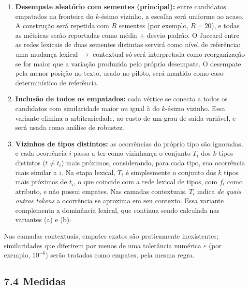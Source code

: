 \documentclass[11pt,a4paper]{article}
\begin{document}
\begin{enumerate}[label=(\alph*)]

    \item \textbf{Desempate aleatório com sementes (principal):} entre
    candidatos empatados na fronteira do $k$-ésimo vizinho, a escolha será
    uniforme ao acaso. A construção será repetida com $R$ sementes (por
    exemplo, $R=20$), e todas as métricas serão reportadas como média $\pm$
    desvio padrão. O Jaccard entre as redes lexicais de duas sementes
    distintas servirá como nível de referência: uma mudança lexical $\to$
    contextual só será interpretada como reorganização se for maior que a
    variação produzida pelo próprio desempate. O desempate pela menor posição
    no texto, usado no piloto, será mantido como caso determinístico de
    referência.

    \item \textbf{Inclusão de todos os empatados:} cada vértice se conecta a
    todos os candidatos com similaridade maior ou igual à do $k$-ésimo
    vizinho. Essa variante elimina a arbitrariedade, ao custo de um grau de
    saída variável, e será usada como análise de robustez.

    \item \textbf{Vizinhos de tipos distintos:} as ocorrências do próprio tipo
    são ignoradas, e cada ocorrência $i$ passa a ter como vizinhança o conjunto
    $T_i$ dos $k$ tipos distintos ($t\neq t_i$) mais próximos, considerando,
    para cada tipo, sua ocorrência mais similar a $i$. Na etapa lexical, $T_i$
    é simplesmente o conjunto dos $k$ tipos mais próximos de $t_i$, o que
    coincide com a rede lexical de tipos, com $f_t$ como atributo, e não possui
    empates. Nas camadas contextuais, $T_i$ indica \emph{de quais outros
    tokens} a ocorrência se aproxima em seu contexto. Essa variante
    complementa a dominância lexical, que continua sendo calculada nas
    variantes (a) e (b).

\end{enumerate}

Nas camadas contextuais, empates exatos são praticamente inexistentes;
similaridades que diferirem por menos de uma tolerância numérica $\varepsilon$
(por exemplo, $10^{-6}$) serão tratadas como empates, pela mesma regra.

\subsection*{7.4 Medidas}
\end{document}
